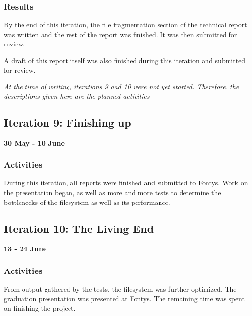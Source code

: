 \subsubsection{Results}

By the end of this iteration, the file fragmentation section of the technical report was written and the rest of the report was finished. It was then submitted for review.

A draft of this report itself was also finished during this iteration and submitted for review.

\emph{At the time of writing, iterations 9 and 10 were not yet started. Therefore, the descriptions given here are the planned activities}

\subsection{Iteration 9: Finishing up}

\textbf{30 May - 10 June}

\subsubsection{Activities}

During this iteration, all reports were finished and submitted to Fontys. Work on the presentation began, as well as more and more tests to determine the bottlenecks of the filesystem as well as its performance.

\subsection{Iteration 10: The Living End}

\textbf{13 - 24 June}

\subsubsection{Activities}

From output gathered by the tests, the filesystem was further optimized. The graduation presentation was presented at Fontys. The remaining time was spent on finishing the project.
